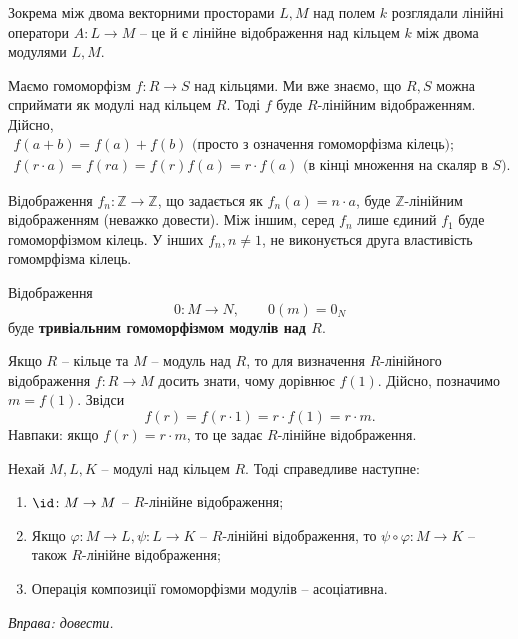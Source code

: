 \documentclass{math_library}
\begin{document}
\begin{example}
Зокрема між двома векторними просторами $L,M$ над полем $k$ розглядали лінійні оператори $A \colon L \to M$ -- це й є лінійне відображення над кільцем $k$ між двома модулями $L,M$.
\end{example}

\begin{example}
Маємо гомоморфізм $f \colon R \to S$ над кільцями. Ми вже знаємо, що $R,S$ можна сприймати як модулі над кільцем $R$. Тоді $f$ буде $R$-лінійним відображенням. Дійсно,
\begin{align*}
f(a+b) = f(a) + f(b) \text{ (просто з означення гомоморфізма кілець)}; \\ 
f(r \cdot a) = f(ra) = f(r)f(a) = r \cdot f(a) \text{ (в кінці множення на скаляр в $S$)}.
\end{align*}
\end{example}

\begin{example}
Відображення $f_n \colon \mathbb{Z} \to \mathbb{Z}$, що задається як $f_n(a) = n \cdot a$, буде $\mathbb{Z}$-лінійним відображенням (неважко довести). Між іншим, серед $f_n$ лише єдиний $f_1$ буде гомоморфізмом кілець. У інших $f_n, n \neq 1$, не виконується друга властивість гомомрфізма кілець.
\end{example}

\begin{example}
Відображення \[
0 \colon M \to N, \qquad 0(m) = 0_N
\] буде \textbf{тривіальним гомоморфізмом модулів над $R$}.
\end{example}

\begin{example}
Якщо $R$ -- кільце та $M$ -- модуль над $R$, то для визначення $R$-лінійного відображення $f \colon R \to M$ досить знати, чому дорівнює $f(1)$. Дійсно, позначимо $m = f(1)$. Звідси \[
f(r) = f(r \cdot 1) = r \cdot f(1) = r \cdot m.
\]
Навпаки: якщо $f(r) = r \cdot m$, то це задає $R$-лінійне відображення.
\end{example}

\begin{proposition}
Нехай $M,L,K$ -- модулі над кільцем $R$. Тоді справедливе наступне:
\begin{enumerate}[nosep,wide=0pt,label={\arabic*)}]
\item $\id \colon M \to M$ -- $R$-лінійне відображення;
\item Якщо $\varphi \colon M \to L, \psi \colon L \to K$ -- $R$-лінійні відображення, то $\psi \circ \varphi \colon M \to K$ -- також $R$-лінійне відображення;
\item Операція композиції гомоморфізми модулів -- асоціативна.
\end{enumerate}
\textit{Вправа: довести.}
\end{proposition}
\end{document}
